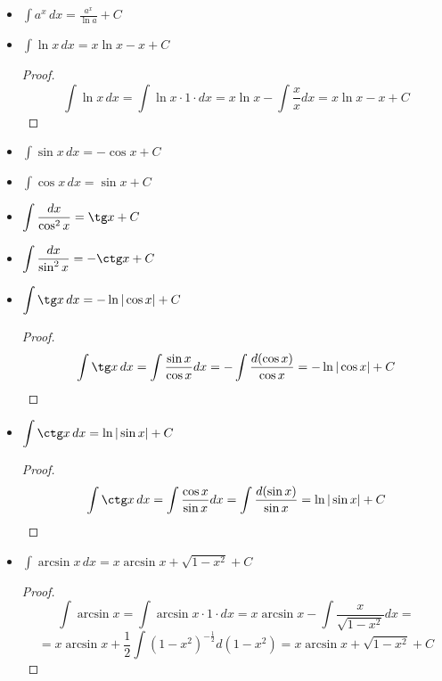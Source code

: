 \begin{itemize}
	\item $\displaystyle \int a^x\,dx = \frac{a^x}{\ln a} + C$
	
	\item $\displaystyle \int \ln x\,dx = x \ln x - x + C$
	\begin{proof}
	\begin{equation*}
	\int \ln x\,dx =
	\int \ln x \cdot 1 \cdot dx =
	x \ln x - \int \frac{x}x dx =
	x \ln x - x + C
	\end{equation*}
	\end{proof}
	
	\item $\displaystyle \int \sin x\,dx = -\cos x + C$
	
	\item $\displaystyle \int \cos x\,dx = \sin x + C$
	
	\item $\displaystyle \int \frac{dx}{\cos^2 x} = \tg x + C$
	
	\item $\displaystyle \int \frac{dx}{\sin^2 x} = -\ctg x + C$
	
	\item $\displaystyle \int \tg x\,dx = -\ln |\cos x| + C$
	\begin{proof}
	\begin{equation*}
	\int \tg x\,dx =
	\int \frac{\sin x}{\cos x} dx =
	-\int \frac{d(\cos x)}{\cos x} =
	-\ln |\cos x| + C
	\end{equation*}
	\end{proof}
	
	\item $\displaystyle \int \ctg x\,dx = \ln |\sin x| + C$
	\begin{proof}
	\begin{equation*}
	\int \ctg x\,dx =
	\int \frac{\cos x}{\sin x} dx =
	\int \frac{d(\sin x)}{\sin x} =
	\ln |\sin x| + C
	\end{equation*}
	\end{proof}
	
	\item $\displaystyle \int \arcsin x\,dx = x \arcsin x + \sqrt{1 - x^2} + C$
	\begin{proof}
	\begin{equation*}
	\int \arcsin x =
	\int \arcsin x \cdot 1 \cdot dx =
	x \arcsin x - \int \frac{x}{\sqrt{1 - x^2}} dx =
	\end{equation*}
	\begin{equation*}
	= x \arcsin x + \frac12 \int (1 - x^2)^{-\tfrac12} d(1 - x^2) =
	x \arcsin x + \sqrt{1 - x^2} + C
	\end{equation*}
	\end{proof}
	

\end{itemize}
